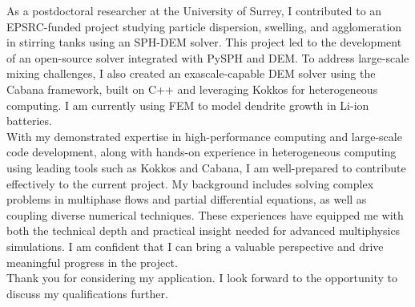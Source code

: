 \documentclass[11pt,a4paper,roman]{moderncv}
\begin{document}
\vspace{1em}
As a postdoctoral researcher at the University of Surrey, I
contributed to an EPSRC-funded project studying particle dispersion,
swelling, and agglomeration in stirring tanks using an SPH-DEM
solver. This project led to the development of an open-source solver
integrated with PySPH and DEM. To address large-scale mixing
challenges, I also created an exascale-capable DEM solver using the
Cabana framework, built on C++ and leveraging Kokkos for heterogeneous
computing. I am currently using FEM to model dendrite growth in Li-ion batteries.\\


\vspace{1em}
With my demonstrated expertise in high-performance computing and
large-scale code development, along with hands-on experience in
heterogeneous computing using leading tools such as Kokkos and Cabana,
I am well-prepared to contribute effectively to the current
project. My background includes solving complex problems in multiphase
flows and partial differential equations, as well as coupling diverse
numerical techniques. These experiences have equipped me with both the
technical depth and practical insight needed for advanced multiphysics
simulations. I am confident that I can bring a valuable perspective
and drive meaningful progress in the project.\\



\vspace{1em}
Thank you for considering my application. I look forward to the
opportunity to discuss my qualifications further.\\



\vspace{0.5cm}


\makeletterclosing
\end{document}
